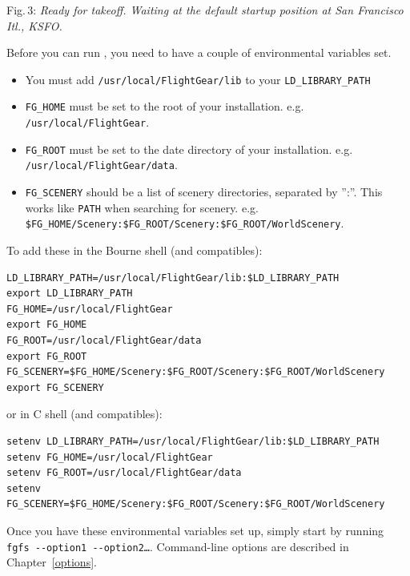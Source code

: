  \noindent
Fig.\,3: \textit{Ready for takeoff. Waiting at the default startup position at San
Francisco Itl., KSFO.}
\medskip

Before you can run \FlightGear{}, you need to have a couple of environmental variables set.

\begin{itemize}
\item You must add \texttt{/usr/local/FlightGear/lib} to your \texttt{LD\_LIBRARY\_PATH}
\item \texttt{FG\_HOME} must be set to the root of your \FlightGear{} installation. e.g. \texttt{/usr/local/FlightGear}.
\item \texttt{FG\_ROOT} must be set to the date directory of your \FlightGear{} installation. e.g. \texttt{/usr/local/FlightGear/data}.
\item \texttt{FG\_SCENERY} should be a list of scenery directories, separated by '':''. This works like \texttt{PATH} when searching for scenery. e.g. \texttt{\$FG\_HOME/Scenery:\$FG\_ROOT/Scenery:\$FG\_ROOT/WorldScenery}.
\end{itemize}

\noindent
To add these in the Bourne shell (and compatibles):
\begin{verbatim}
LD_LIBRARY_PATH=/usr/local/FlightGear/lib:$LD_LIBRARY_PATH
export LD_LIBRARY_PATH
FG_HOME=/usr/local/FlightGear
export FG_HOME
FG_ROOT=/usr/local/FlightGear/data
export FG_ROOT
FG_SCENERY=$FG_HOME/Scenery:$FG_ROOT/Scenery:$FG_ROOT/WorldScenery
export FG_SCENERY
\end{verbatim}
\noindent
 or in C shell (and compatibles):
\begin{verbatim}
setenv LD_LIBRARY_PATH=/usr/local/FlightGear/lib:$LD_LIBRARY_PATH
setenv FG_HOME=/usr/local/FlightGear
setenv FG_ROOT=/usr/local/FlightGear/data
setenv FG_SCENERY=$FG_HOME/Scenery:$FG_ROOT/Scenery:$FG_ROOT/WorldScenery
\end{verbatim}
Once you have these environmental variables set up, simply start \FlightGear{} by running
\texttt{fgfs -$ $-option1 -$ $-option2\dots}.
\medskip
Command-line options are described in Chapter~\ref{options}.

